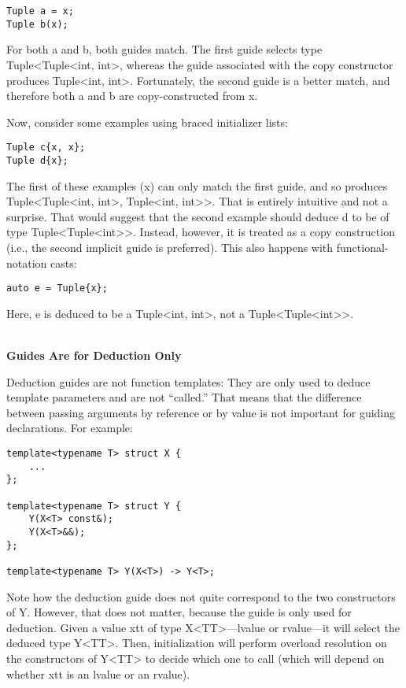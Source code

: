 \begin{lstlisting}[style=styleCXX]
Tuple a = x;
Tuple b(x);
\end{lstlisting}

For both a and b, both guides match. The first guide selects type Tuple<Tuple<int, int>, whereas the guide associated with the copy constructor produces Tuple<int, int>. Fortunately, the second guide is a better match, and therefore both a and b are copy-constructed from x.

Now, consider some examples using braced initializer lists:

\begin{lstlisting}[style=styleCXX]
Tuple c{x, x};
Tuple d{x};
\end{lstlisting}

The first of these examples (x) can only match the first guide, and so produces Tuple<Tuple<int, int>, Tuple<int, int>>. That is entirely intuitive and not a surprise. That would suggest that the second example should deduce d to be of type Tuple<Tuple<int>>. Instead, however, it is treated as a copy construction (i.e., the second implicit guide is preferred). This also happens with functional-notation casts:

\begin{lstlisting}[style=styleCXX]
auto e = Tuple{x};
\end{lstlisting}

Here, e is deduced to be a Tuple<int, int>, not a Tuple<Tuple<int>>.

\hspace*{\fill} \\ %
\noindent
\textbf{Guides Are for Deduction Only}

Deduction guides are not function templates: They are only used to deduce template parameters and are not “called.” That means that the difference between passing arguments by reference or by value is not important for guiding declarations. For example:

\begin{lstlisting}[style=styleCXX]
template<typename T> struct X {
	...
};

template<typename T> struct Y {
	Y(X<T> const&);
	Y(X<T>&&);
};

template<typename T> Y(X<T>) -> Y<T>;
\end{lstlisting}

Note how the deduction guide does not quite correspond to the two constructors of Y. However, that does not matter, because the guide is only used for deduction. Given a value xtt of type X<TT>—lvalue or rvalue—it will select the deduced type Y<TT>. Then, initialization will perform overload resolution on the constructors of Y<TT> to decide which one to call (which will depend on whether xtt is an lvalue or an rvalue).





